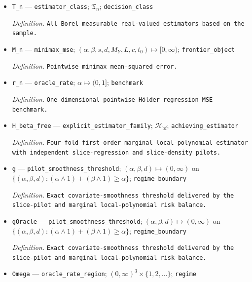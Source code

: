 \documentclass{article}
\begin{document}
\begin{itemize}
  \item \texttt{T\_\allowbreak{}n} --- \texttt{estimator\_\allowbreak{}class}; \(\mathfrak T_n\); \texttt{decision\_\allowbreak{}class}
  \par\smallskip\noindent\emph{Definition.} \texttt{All Borel measurable real-\allowbreak{}valued estimators based on the sample.}
  \item \texttt{M\_\allowbreak{}n} --- \texttt{minimax\_\allowbreak{}mse}; \((\alpha,\beta,s,d,M_Y,L,c,t_0)\mapsto[0,\infty)\); \texttt{frontier\_\allowbreak{}object}
  \par\smallskip\noindent\emph{Definition.} \texttt{Pointwise minimax mean-\allowbreak{}squared error.}
  \item \texttt{r\_\allowbreak{}n} --- \texttt{oracle\_\allowbreak{}rate}; \(\alpha\mapsto(0,1]\); \texttt{benchmark}
  \par\smallskip\noindent\emph{Definition.} \texttt{One-\allowbreak{}dimensional pointwise Hölder-\allowbreak{}regression MSE benchmark.}
  \item \texttt{H\_\allowbreak{}beta\_\allowbreak{}free} --- \texttt{explicit\_\allowbreak{}estimator\_\allowbreak{}family}; \(\mathcal H_{\mathrm{bf}}\); \texttt{achieving\_\allowbreak{}estimator}
  \par\smallskip\noindent\emph{Definition.} \texttt{Four-\allowbreak{}fold first-\allowbreak{}order marginal local-\allowbreak{}polynomial estimator with independent slice-\allowbreak{}regression and slice-\allowbreak{}density pilots.}
  \item \texttt{g} --- \texttt{pilot\_\allowbreak{}smoothness\_\allowbreak{}threshold}; \((\alpha,\beta,d)\mapsto(0,\infty)\) on \(\{(\alpha,\beta,d):(\alpha\wedge1)+(\beta\wedge1)\ge\alpha\}\); \texttt{regime\_\allowbreak{}boundary}
  \par\smallskip\noindent\emph{Definition.} \texttt{Exact covariate-\allowbreak{}smoothness threshold delivered by the slice-\allowbreak{}pilot and marginal local-\allowbreak{}polynomial risk balance.}
  \item \texttt{gOracle} --- \texttt{pilot\_\allowbreak{}smoothness\_\allowbreak{}threshold}; \((\alpha,\beta,d)\mapsto(0,\infty)\) on \(\{(\alpha,\beta,d):(\alpha\wedge1)+(\beta\wedge1)\ge\alpha\}\); \texttt{regime\_\allowbreak{}boundary}
  \par\smallskip\noindent\emph{Definition.} \texttt{Exact covariate-\allowbreak{}smoothness threshold delivered by the slice-\allowbreak{}pilot and marginal local-\allowbreak{}polynomial risk balance.}
  \item \texttt{Omega} --- \texttt{oracle\_\allowbreak{}rate\_\allowbreak{}region}; \((0,\infty)^3\times\{1,2,\ldots\}\); \texttt{regime}

\end{itemize}
\end{document}
